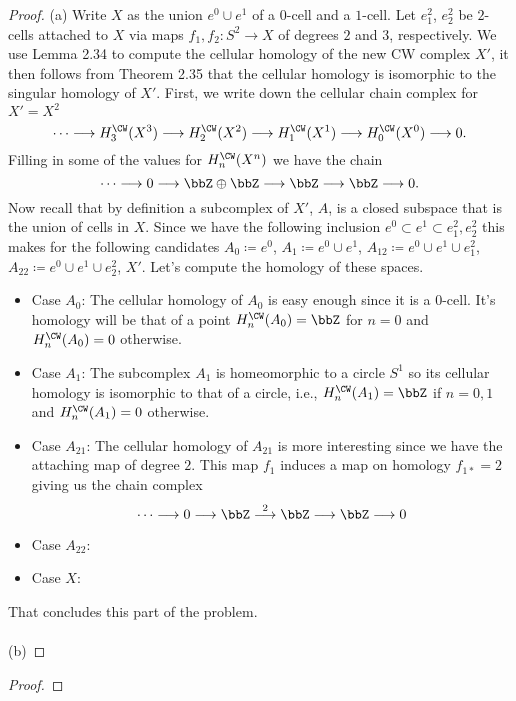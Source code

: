 \begin{proof}
(a) Write $X$ as the union $e^0\cup e^1$ of a $0$-cell and a $1$-cell. Let
$e^2_1$, $e^2_2$ be $2$-cells attached to $X$ via maps $f_1,f_2\colon
S^2\to X$ of degrees $2$ and $3$, respectively. We use Lemma 2.34 to
compute the cellular homology of the new CW complex $X'$, it then follows
from Theorem 2.35 that the cellular homology is isomorphic to the singular
homology of $X'$. First, we write down the cellular chain complex for
$X'=X^2$
\begin{equation}
\label{eq:cellular-chain-x}
\cdots\longrightarrow
H_3^\CW(X^3)\longrightarrow
H_2^\CW(X^2)\longrightarrow
H_1^\CW(X^1)\longrightarrow
H_0^\CW(X^0)\longrightarrow
0.
\end{equation}
Filling in some of the values for $H_n^\CW(X^n)$ we have the chain
\begin{equation}
\label{eq:cellular-chain-x-2}
\cdots\longrightarrow
0\longrightarrow
\bbZ\oplus\bbZ\longrightarrow
\bbZ\longrightarrow
\bbZ\longrightarrow
0.
\end{equation}
Now recall that by definition a subcomplex of $X'$, $A$, is a closed
subspace that is the union of cells in $X$. Since we have the following
inclusion $e^0\subset e^1\subset e_1^2,e_2^2$ this makes for the following
candidates $A_0\coloneqq e^0$, $A_1\coloneqq e^0\cup e^1$, $A_{12}\coloneqq
e^0\cup e^1\cup e_1^2$,
$A_{22}\coloneqq e^0\cup e^1\cup e_2^2$, $X'$. Let's compute the homology
of these spaces.
\begin{itemize}
\item Case $A_0$: The cellular homology of $A_0$ is easy enough since it
is a $0$-cell. It's homology will be that of a point $H_n^\CW(A_0)=\bbZ$
for $n=0$ and $H_n^\CW(A_0)=0$ otherwise.
\item Case $A_1$: The subcomplex $A_1$ is homeomorphic to a circle $S^1$ so
  its cellular homology is isomorphic to that of a circle, i.e.,
  $H_n^\CW(A_1)=\bbZ$ if $n=0,1$ and $H_n^\CW(A_1)=0$ otherwise.
\item Case $A_{21}$: The cellular homology of $A_{21}$ is more
  interesting since we have the attaching map of degree $2$. This map $f_1$
  induces a map on homology $f_{1*}=2$ giving us the chain complex
  \begin{equation}
  \label{eq:chain-complex-a-1-2}
  \cdots\longrightarrow
  0\longrightarrow
  \bbZ\overset{2}{\longrightarrow}
  \bbZ\longrightarrow
  \bbZ\longrightarrow
  0
  \end{equation}
\item Case $A_{22}$:
\item Case $X$:
\end{itemize}
That concludes this part of the problem.
\\\\
(b)
\end{proof}
\newpage

\begin{problem}
\end{problem}
\begin{proof}
\end{proof}

